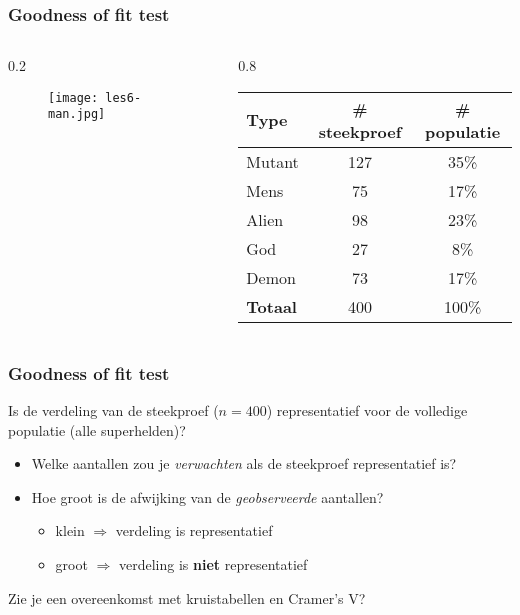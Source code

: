 \documentclass[aspectratio=169]{beamer}
\begin{document}
\begin{frame}
  \frametitle{Goodness of fit test}
  \begin{columns}
    \begin{column} {0.2 \textwidth}
      
      \begin{figure}
        \centering
        \texttt{[image: les6-man.jpg]}
      \end{figure}
      
    \end{column}
    
    \begin{column} { 0.8 \textwidth}
      \begin{table}[h]
        \begin{tabular}{@{}lcc@{}}
          \toprule
          \textbf{Type}   & \textbf{\# steekproef} & \textbf{\# populatie} \\ \midrule
          Mutant          &          127           &         35\%          \\
          Mens            &           75           &         17\%          \\
          Alien           &           98           &         23\%          \\
          God             &           27           &          8\%          \\
          Demon           &           73           &         17\%          \\ \midrule
          \textbf{Totaal} &          400           &         100\%         \\
        \end{tabular}
      \end{table}
    \end{column}
  \end{columns}
\end{frame}

\begin{frame}
  \frametitle{Goodness of fit test}
  Is de verdeling van de steekproef ($n = 400$) representatief voor de volledige populatie (alle superhelden)?
  
  \begin{itemize}
    \item Welke aantallen zou je \textit{verwachten} als de steekproef representatief is?
    \item Hoe groot is de afwijking van de \textit{geobserveerde} aantallen?
    \begin{itemize}
      \item klein $\Rightarrow$ verdeling is representatief
      \item groot $\Rightarrow$ verdeling is \textbf{niet} representatief
    \end{itemize}
  \end{itemize}
  
  \pause
  Zie je een overeenkomst met kruistabellen en Cramer's V?
\end{frame}
\end{document}
